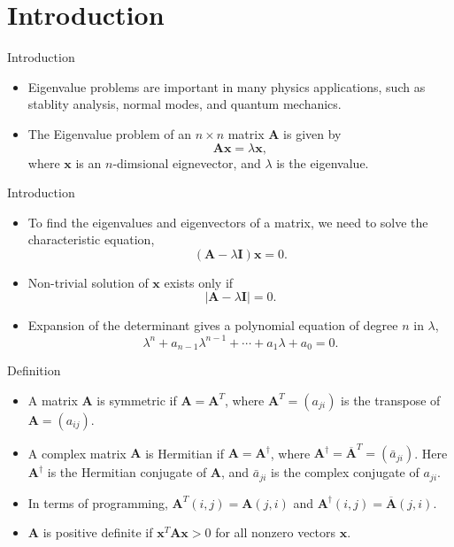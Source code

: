 \documentclass{beamer}
\begin{document}
\section[Introduction]{Introduction}
\begin{frame}{Introduction}
    \begin{itemize}
    \item Eigenvalue problems are important in many physics applications,
    such as stablity analysis, normal modes, and quantum mechanics.
    \item The Eigenvalue problem of an $n\times n$ matrix $\mathbf{A}$ is given by 
\[ \mathbf{A x}=\lambda \mathbf{x},
\] 
where  $\mathbf{x}$ is an $n$-dimsional eignevector, and $\lambda$ is the eigenvalue.
     \end{itemize}
    \end{frame}
\begin{frame}{Introduction}
\begin{itemize}
\item To find the eigenvalues and eigenvectors of a matrix, we need to solve the characteristic equation, 
\[ (\mathbf{A}-\lambda \mathbf{I})\mathbf{x}=0.
\]
\item Non-trivial solution of $\mathbf{x}$ exists only if 
\[
|\mathbf{A}-\lambda \mathbf{I}|=0.
\]
\item Expansion of the determinant gives a polynomial equation of degree $n$ in $\lambda$,
\[
\lambda^n +a_{n-1}\lambda^{n-1}+\cdots +a_1\lambda +a_0=0.
\]  
 \end{itemize}
\end{frame}
\begin{frame}{Definition}
    \begin{itemize}
        \item A matrix $\mathbf{A}$ is symmetric if $\mathbf{A}=\mathbf{A}^T$, where $\mathbf{A}^T=\left(a_{j i}\right)$ is the transpose of $\mathbf{A}=\left(a_{i j}\right)$. 
        \item A complex matrix $\mathbf{A}$ is Hermitian if $\mathbf{A}=\mathbf{A}^\dagger$, where $\mathbf{A}^\dagger=\overline{\mathbf{A}}^T=\left(\bar{a}_{j i}\right)$. 
        Here $\mathbf{A}^\dagger$ is the Hermitian conjugate  of $\mathbf{A}$, and $\bar{a}_{j i}$ is the complex conjugate of $a_{j i}$.
        \item In terms of programming, $\mathbf{A}^T(i, j)=\mathbf{A}(j, i)$ and $\mathbf{A}^\dagger(i, j)=\overline{\mathbf{A}}(j, i)$. 
        \item $\mathbf{A}$ is positive definite if $\mathbf{x}^T \mathbf{A} \mathbf{x}>0$ for all nonzero vectors $\mathbf{x}$.
    \end{itemize}
\end{frame}
\end{document}
